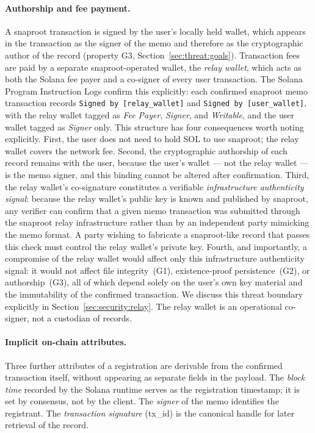 \documentclass[11pt,a4paper]{article}
\begin{document}
\paragraph{Authorship and fee payment.} A snaproot transaction is
signed by the user's locally held wallet, which appears in the
transaction as the signer of the memo and therefore as the
cryptographic author of the record (property G3,
Section~\ref{sec:threat:goals}). Transaction fees are paid by a
separate snaproot-operated wallet, the \emph{relay wallet}, which
acts as both the Solana fee payer and a co-signer of every user
transaction. The Solana Program Instruction Logs confirm this
explicitly: each confirmed snaproot memo transaction records
\texttt{Signed by [relay\_wallet]} and \texttt{Signed by
[user\_wallet]}, with the relay wallet tagged as \emph{Fee Payer},
\emph{Signer}, and \emph{Writable}, and the user wallet tagged as
\emph{Signer} only. This structure has four consequences worth noting
explicitly. First, the user does not need to hold SOL to use
snaproot; the relay wallet covers the network fee. Second, the
cryptographic authorship of each record remains with the user,
because the user's wallet --- not the relay wallet --- is the memo
signer, and this binding cannot be altered after confirmation. Third,
the relay wallet's co-signature constitutes a verifiable
\emph{infrastructure authenticity signal}: because the relay
wallet's public key is known and published by snaproot, any verifier
can confirm that a given memo transaction was submitted through the
snaproot relay infrastructure rather than by an independent party
mimicking the memo format. A party wishing to fabricate a
snaproot-like record that passes this check must control the relay
wallet's private key. Fourth, and importantly, a compromise of the
relay wallet would affect only this infrastructure authenticity
signal: it would not affect file integrity~(G1), existence-proof
persistence~(G2), or authorship~(G3), all of which depend solely on
the user's own key material and the immutability of the confirmed
transaction. We discuss this threat boundary explicitly in
Section~\ref{sec:security:relay}. The relay wallet is an operational
co-signer, not a custodian of records.

\paragraph{Implicit on-chain attributes.} Three further attributes of a
registration are derivable from the confirmed transaction itself, without
appearing as separate fields in the payload. The \emph{block time}
recorded by the Solana runtime serves as the registration timestamp; it
is set by consensus, not by the client. The \emph{signer} of the memo
identifies the registrant. The \emph{transaction signature} (tx\_id) is
the canonical handle for later retrieval of the record.
\end{document}
